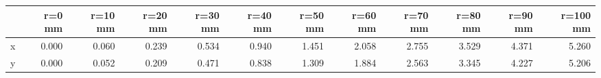 \documentclass[convert={convertexe={magick.exe}}]{standalone}
\begin{document}
\begin{tabular}{lrrrrrrrrrrr}
\toprule
{} &  r=0 mm &  r=10 mm &  r=20 mm &  r=30 mm &  r=40 mm &  r=50 mm &  r=60 mm &  r=70 mm &  r=80 mm &  r=90 mm &  r=100 mm \\
\midrule
x &   0.000 &    0.060 &    0.239 &    0.534 &    0.940 &    1.451 &    2.058 &    2.755 &    3.529 &    4.371 &     5.260 \\
y &   0.000 &    0.052 &    0.209 &    0.471 &    0.838 &    1.309 &    1.884 &    2.563 &    3.345 &    4.227 &     5.206 \\
\bottomrule
\end{tabular}
\end{document}
